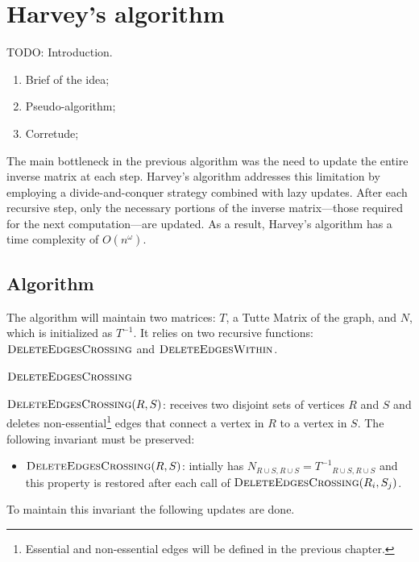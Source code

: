 \chapter{Harvey's algorithm}

TODO: Introduction.

\begin{enumerate}
    \item Brief of the idea;
    \item Pseudo-algorithm;
    \item Corretude;
\end{enumerate}

The main bottleneck in the previous algorithm was the need to update the entire inverse matrix at each step. 
Harvey's algorithm addresses this limitation by employing a divide-and-conquer strategy combined with lazy updates. 
After each recursive step, only the necessary portions of the inverse matrix—those required for the next computation—are updated.
As a result, Harvey's algorithm has a time complexity of \(O(n^\omega)\).

\section{Algorithm}

The algorithm will maintain two matrices: \(T\), a Tutte Matrix of the graph, and \(N\), which is initialized as \(T^{-1}\).
It relies on two recursive functions: \(\textsc{DeleteEdgesCrossing}\) and \(\textsc{DeleteEdgesWithin}\). 

\subsubsection*{\(\textsc{DeleteEdgesCrossing}\)}

$\textsc{DeleteEdgesCrossing}(R, S)$: receives two disjoint sets of vertices \(R\) and \(S\) and 
deletes non-essential\footnote{Essential and non-essential edges will be defined in the previous chapter.} 
edges that connect a vertex in \(R\) to a vertex in \(S\).
The following invariant must be preserved:
\begin{itemize}
    \item \(\textsc{DeleteEdgesCrossing}(R, S)\): intially has \(N_{R \cup S, R \cup S} = {T^{-1}}_{R \cup S, R \cup S}\) and this property is restored after each call 
    of \(\textsc{DeleteEdgesCrossing}(R_i, S_j)\).
\end{itemize}
To maintain this invariant the following updates are done. 

